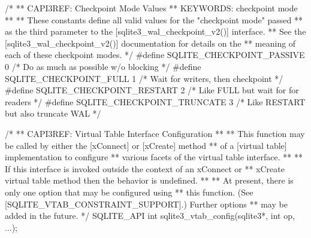 \begin{Codex}[label=sqlite3.h,numbers=left]
{/*
** CAPI3REF: Checkpoint Mode Values
** KEYWORDS: {checkpoint mode}
**
** These constants define all valid values for the "checkpoint mode" passed
** as the third parameter to the [sqlite3_wal_checkpoint_v2()] interface.
** See the [sqlite3_wal_checkpoint_v2()] documentation for details on the
** meaning of each of these checkpoint modes.
*/
#define SQLITE_CHECKPOINT_PASSIVE  0  /* Do as much as possible w/o blocking */
#define SQLITE_CHECKPOINT_FULL     1  /* Wait for writers, then checkpoint */
#define SQLITE_CHECKPOINT_RESTART  2  /* Like FULL but wait for for readers */
#define SQLITE_CHECKPOINT_TRUNCATE 3  /* Like RESTART but also truncate WAL */

/*
** CAPI3REF: Virtual Table Interface Configuration
**
** This function may be called by either the [xConnect] or [xCreate] method
** of a [virtual table] implementation to configure
** various facets of the virtual table interface.
**
** If this interface is invoked outside the context of an xConnect or
** xCreate virtual table method then the behavior is undefined.
**
** At present, there is only one option that may be configured using
** this function. (See [SQLITE_VTAB_CONSTRAINT_SUPPORT].)  Further options
** may be added in the future.
*/
SQLITE_API int sqlite3_vtab_config(sqlite3*, int op, ...);

}
\end{Codex}
